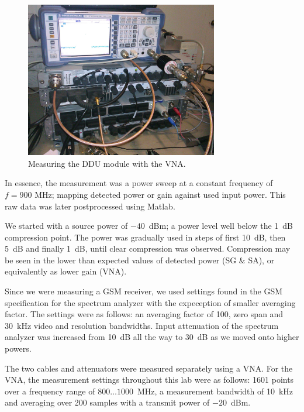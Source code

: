 \documentclass[a4paper, 12pt]{article}
\begin{document}
\begin{figure}[h!]
	\begin{center}
	\includegraphics[width=0.75\textwidth]{img/vna-ddu-vna.jpg}
	\caption{Measuring the DDU module with the VNA.}
	\label{f:vna2}
	\end{center}
	\vspace*{-12pt}
\end{figure}

In essence, the measurement was a power sweep at a constant frequency of 
$f = 900$ MHz; mapping detected power or gain against used input power. 
This raw data was later postprocessed using Matlab.

We started with a source power of $-40$~dBm; a power level well below the 
1~dB compression point. The power was gradually used in steps of first 
10~dB, then 5~dB and finally 1~dB, until clear compression was observed. 
Compression may be seen in the lower than expected values of detected 
power (SG \& SA), or equivalently as lower gain (VNA).

Since we were measuring a GSM receiver, we used settings found in the GSM 
specification for the spectrum analyzer with the expeception of smaller 
averaging factor. The settings were as follows: an averaging factor of 100, 
zero span and 30~kHz video and resolution bandwidths. Input attenuation of the 
spectrum analyzer was increased from 10~dB all the way to 30~dB as we moved onto 
higher powers. 

The two cables and attenuators were measured separately using a VNA. For the VNA, 
the measurement settings throughout this lab were as follows: 1601 points over 
a frequency range of $800 \ldots 1000$~MHz, a measurement bandwidth of 10~kHz 
and averaging over 200 samples with a transmit power of $-20$~dBm.
\end{document}
